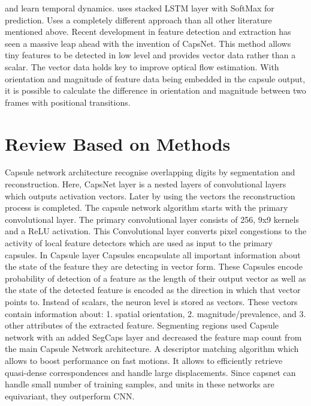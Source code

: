 \documentclass[11pt,english]{article}
\begin{document}
and learn temporal dynamics. \citep{yue2015beyond} uses stacked LSTM layer with SoftMax for prediction. \citep{sabour2017dynamic} Uses a completely different approach than all other literature mentioned above. 
Recent development in feature detection and extraction has seen a massive leap ahead with the invention of CapsNet\citep{sabour2017dynamic}. This method allows tiny features to be detected in low level and provides vector data rather than a scalar. The vector data holds key to improve optical flow estimation. With orientation and magnitude of feature data being embedded in the capsule output, it is possible to calculate the difference in orientation and magnitude between two frames with positional transitions.


\section{Review Based on Methods}
Capsule network architecture \citep{sabour2017dynamic} recognise overlapping digits by segmentation and reconstruction. Here, CapsNet layer is a nested layers of convolutional layers which outputs activation vectors. Later by using the vectors the reconstruction process is completed. The capsule network algorithm starts with the primary convolutional layer. The primary convolutional layer consists of 256, 9x9 kernels and a ReLU activation. This Convolutional layer converts pixel congestions to the activity of local feature detectors which are used as input to the primary capsules. In Capsule layer Capsules encapsulate all important information about the state of the feature they are detecting in vector form. These Capsules encode probability of detection of a feature as the length of their output vector as well as the state of the detected feature is encoded as the direction in which that vector points to. Instead of scalars, the neuron level is stored as vectors. These vectors contain information about: 1. spatial orientation, 2. magnitude/prevalence, and 3. other attributes of the extracted feature.
Segmenting regions \citep{lalonde2018capsules} used Capsule network with an added SegCaps layer and \citep{afshar2018brain} decreased the feature map count from the main Capsule Network architecture. A descriptor matching algorithm \citep{weinzaepfel2013deepflow} which allows to boost performance on fast motions. It allows to efficiently retrieve quasi-dense correspondences and handle large displacements. Since capsnet can handle small number of training samples, and units in these networks are equivariant, they outperform CNN.
\end{document}
